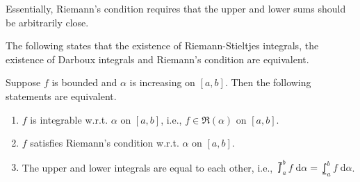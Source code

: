 \documentclass[thmcnt=section, 12pt]{my-elegantbook}
\begin{document}
Essentially, Riemann's condition requires that the upper and lower sums should be arbitrarily close.


The following states that the existence of Riemann-Stieltjes integrals, the existence of Darboux integrals and Riemann's condition are equivalent.

\begin{theorem} \label{thm:28}
    Suppose $f$ is bounded and $\alpha$ is increasing on $[a, b]$. Then the following statements are equivalent.
    \begin{enumerate}
        \item $f$ is integrable w.r.t. $\alpha$ on $[a, b]$, i.e., $f \in \mathfrak{R}(\alpha)$ on $[a, b]$.
        \item $f$ satisfies Riemann's condition w.r.t. $\alpha$ on $[a, b]$.
        \item The upper and lower integrals are equal to each other, i.e., $\upint_a^b f \; \mathrm{d}\alpha = \lowint_a^b f \; \mathrm{d}\alpha$.
    \end{enumerate}
\end{theorem}
\end{document}
